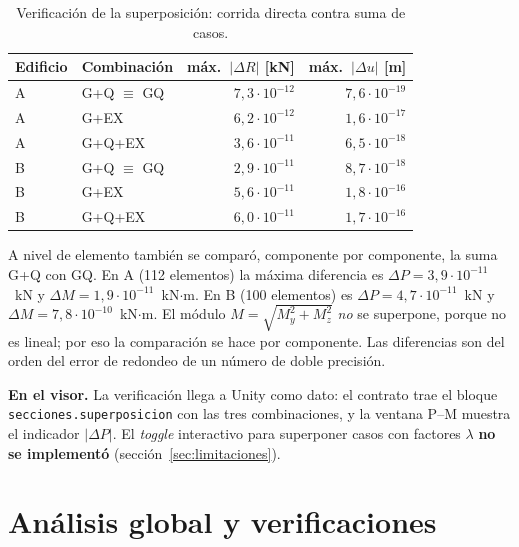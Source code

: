 \documentclass[11pt,a4paper]{article}
\begin{document}
\begin{table}[h]
\centering
\caption{Verificación de la superposición: corrida directa contra suma de casos.}
\begin{tabular}{llrr}
\toprule
Edificio & Combinación & máx.\ $|\Delta R|$ [kN] & máx.\ $|\Delta u|$ [m] \\
\midrule
A & G+Q $\equiv$ GQ & $7{,}3\cdot10^{-12}$ & $7{,}6\cdot10^{-19}$ \\
A & G+EX & $6{,}2\cdot10^{-12}$ & $1{,}6\cdot10^{-17}$ \\
A & G+Q+EX & $3{,}6\cdot10^{-11}$ & $6{,}5\cdot10^{-18}$ \\
B & G+Q $\equiv$ GQ & $2{,}9\cdot10^{-11}$ & $8{,}7\cdot10^{-18}$ \\
B & G+EX & $5{,}6\cdot10^{-11}$ & $1{,}8\cdot10^{-16}$ \\
B & G+Q+EX & $6{,}0\cdot10^{-11}$ & $1{,}7\cdot10^{-16}$ \\
\bottomrule
\end{tabular}
\end{table}

A nivel de elemento también se comparó, componente por componente, la suma G+Q
con GQ. En A (112 elementos) la máxima diferencia es
$\Delta P = 3{,}9\cdot10^{-11}$~kN y $\Delta M = 1{,}9\cdot10^{-11}$~kN$\cdot$m.
En B (100 elementos) es $\Delta P = 4{,}7\cdot10^{-11}$~kN y
$\Delta M = 7{,}8\cdot10^{-10}$~kN$\cdot$m. El módulo
$M = \sqrt{M_y^2 + M_z^2}$ \emph{no} se superpone, porque no es lineal; por eso
la comparación se hace por componente. Las diferencias son del orden del error
de redondeo de un número de doble precisión.

\textbf{En el visor.} La verificación llega a Unity como dato: el contrato trae
el bloque \texttt{secciones.superposicion} con las tres combinaciones, y la
ventana P--M muestra el indicador $|\Delta P|$. El \emph{toggle} interactivo para
superponer casos con factores $\lambda$ \textbf{no se implementó}
(sección~\ref{sec:limitaciones}).

\section{Análisis global y verificaciones}
\end{document}
